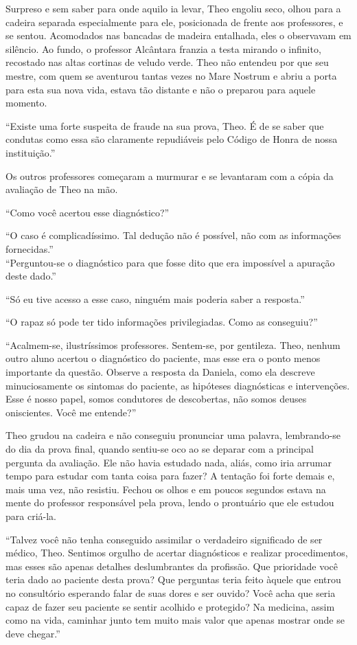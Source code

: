 Surpreso e sem saber para onde aquilo ia levar, Theo engoliu seco, olhou
para a cadeira separada especialmente para ele, posicionada de frente
aos professores, e se sentou. Acomodados nas bancadas de madeira
entalhada, eles o observavam em silêncio. Ao fundo, o professor
Alcântara franzia a testa mirando o infinito, recostado nas altas
cortinas de veludo verde. Theo não entendeu por que seu mestre, com quem
se aventurou tantas vezes no Mare Nostrum e abriu a porta para esta sua
nova vida, estava tão distante e não o preparou para aquele momento.

``Existe uma forte suspeita de fraude na sua prova, Theo. É de se saber
que condutas como essa são claramente repudiáveis pelo Código de Honra
de nossa instituição.''

Os outros professores começaram a murmurar e se levantaram com a cópia
da avaliação de Theo na mão.

``Como você acertou esse diagnóstico?''

``O caso é complicadíssimo. Tal dedução não é possível, não com as
informações fornecidas.''\\
``Perguntou-se o diagnóstico para que fosse dito que era impossível a
apuração deste dado.''

``Só eu tive acesso a esse caso, ninguém mais poderia saber a
resposta.''

``O rapaz só pode ter tido informações privilegiadas. Como as
conseguiu?''

``Acalmem-se, ilustríssimos professores. Sentem-se, por gentileza. Theo,
nenhum outro aluno acertou o diagnóstico do paciente, mas esse era o
ponto menos importante da questão. Observe a resposta da Daniela, como
ela descreve minuciosamente os sintomas do paciente, as hipóteses
diagnósticas e intervenções. Esse é nosso papel, somos condutores de
descobertas, não somos deuses oniscientes. Você me entende?''

Theo grudou na cadeira e não conseguiu pronunciar uma palavra,
lembrando-se do dia da prova final, quando sentiu-se oco ao se deparar
com a principal pergunta da avaliação. Ele não havia estudado nada,
aliás, como iria arrumar tempo para estudar com tanta coisa para fazer?
A tentação foi forte demais e, mais uma vez, não resistiu. Fechou os
olhos e em poucos segundos estava na mente do professor responsável pela
prova, lendo o prontuário que ele estudou para criá-la.

``Talvez você não tenha conseguido assimilar o verdadeiro significado de
ser médico, Theo. Sentimos orgulho de acertar diagnósticos e realizar
procedimentos, mas esses são apenas detalhes deslumbrantes da profissão.
Que prioridade você teria dado ao paciente desta prova? Que perguntas
teria feito àquele que entrou no consultório esperando falar de suas
dores e ser ouvido? Você acha que seria capaz de fazer seu paciente se
sentir acolhido e protegido? Na medicina, assim como na vida, caminhar
junto tem muito mais valor que apenas mostrar onde se deve chegar.''

